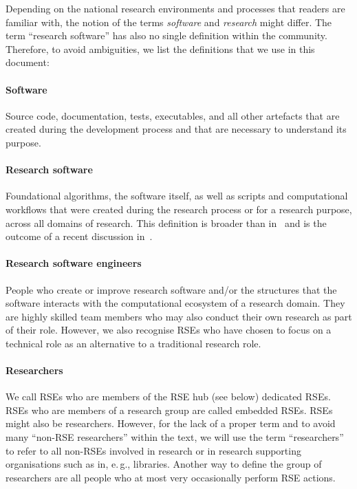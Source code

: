 \documentclass[a4paper]{article}
\newcommand*{\eg}{e.\,g.,\xspace}
\begin{document}
Depending on the national research environments and processes that readers are familiar with, the notion of the terms \emph{software} and \emph{research} might differ.
The term “research software” has also no single definition within the community.
Therefore, to avoid ambiguities, we list the definitions that we use in this document:
\paragraph{Software}
Source code, documentation, tests, executables, and all other artefacts that are created during the development process and that are necessary to understand its purpose.
\paragraph{Research software}
Foundational algorithms, the software itself, as well as scripts and computational workflows that were created during the research process or for a research purpose, across all domains of research.
This definition is broader than in~\autocite{FAIR4RS} and is the outcome of a recent discussion in~\autocite{Gruenpeter2021}.
\paragraph{Research software engineers}
People who create or improve research software and/or the structures that the software interacts with the computational ecosystem of a research domain.
They are highly skilled team members who may also conduct their own research as part of their role.
However, we also recognise RSEs who have chosen to focus on a technical role as an alternative to a traditional research role.
\paragraph{Researchers}
We call RSEs who are members of the RSE hub (see below) dedicated RSEs.
RSEs who are members of a research group are called embedded RSEs.
RSEs might also be researchers.
However, for the lack of a proper term and to avoid many “non-RSE researchers” within the text, we will use the term “researchers” to refer to all non-RSEs involved in research or in research supporting organisations such as in, \eg{} libraries.
Another way to define the group of researchers are all people who at most very occasionally perform RSE actions.
\end{document}
